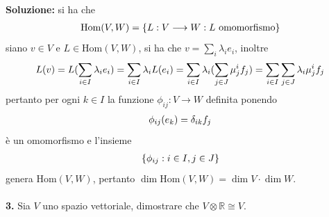 \documentclass{article}
\begin{document}
\textbf{Soluzione:} si ha che
\begin{gather}
    \mathrm{Hom}(V, W) = \{ L : V \longrightarrow W : L \text{ omomorfismo} \} \notag
\end{gather}
siano $v \in V$ e $L \in \mathrm{Hom}(V, W)$, si ha che $v = \sum_i \lambda_i e_i$, inoltre
\begin{gather}
    L(v) = L( \sum_{i \in I} \lambda_i e_i) = \sum_{i \in I} \lambda_i L(e_i) = \sum_{i \in I} \lambda_i ( \sum_{j \in J} \mu^i_j f_j) = \sum_{i \in I} \sum_{j \in J} \lambda_i \mu^i_j f_j  \notag
\end{gather}
pertanto per ogni $k \in I$ la funzione $\phi_{ij} : V \longrightarrow W$ definita ponendo
\begin{gather}
    \phi_{ij}(e_k) = \delta_{ik}f_j \notag
\end{gather}
è un omomorfismo e l'insieme
\begin{gather}
    \{ \phi_{ij} : i \in I, j \in J \} \notag
\end{gather}
genera $\mathrm{Hom}(V, W)$, pertanto $\dim \mathrm{Hom}(V, W) = \dim V \cdot \dim W$. \\ \\
\textbf{3.} Sia $V$ uno spazio vettoriale, dimostrare che $V \otimes \mathbb{R} \cong V$. \\
\end{document}
